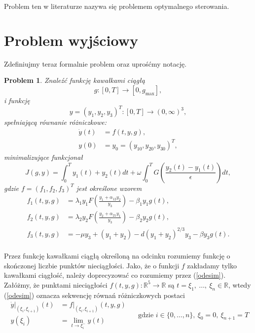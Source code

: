 \documentclass[licencjacka]{pracamgr}
\def\R{\mathbb{R}}
\newtheorem{problem}{Problem}
\begin{document}
Problem ten w literaturze nazywa się problemem optymalnego sterowania.

\section{Problem wyjściowy}
Zdefiniujmy teraz formalnie problem oraz uprośćmy notację.

\begin{problem}\label{problem}
  Znaleźć funkcję kawałkami ciągłą
  \[g: [0, T] \to [0, g_{\max}],\]
  i funkcję
  \[y = {(y_1, y_2, y_3)}^T: [0,T] \to {(0, \infty)}^3,\]
  spełniającą równanie różniczkowe:
  \begin{equation}\label{odesim}
    \begin{aligned}
      \dot{y}(t) &= f(t, y, g), \\
      y(0) &= y_0 = {(y_{10}, y_{20}, y_{30})}^T,
    \end{aligned}
  \end{equation}
  minimalizujące funkcjonał
  \begin{equation}\label{objfsim}
    J(g, y) = \int_0^T y_1(t) + y_2(t)dt + \omega\int_0^T G\left(\frac{y_2(t) - y_1(t)}{\epsilon}\right) dt,
  \end{equation}
  gdzie $f = {(f_1, f_2, f_3)}^T$ jest określone wzorem
  \begin{equation}\label{dynamicsim}
    \begin{aligned}
      f_1(t, y, g) &= \lambda_1y_1F\left(\frac{y_1 + \alpha_{12}y_2}{y_3}\right) - \beta_1y_1g(t), \\
      f_2(t, y, g) &= \lambda_2y_2F\left(\frac{y_2 + \alpha_{21}y_1}{y_3}\right) - \beta_2y_2g(t), \\
      f_3(t, y, g) &= -\mu y_3 + (y_1+y_2) - d{(y_1 + y_2)}^{2/3}y_3 - \beta y_3 g(t). \\
    \end{aligned}
  \end{equation}
\end{problem}

Przez funkcję kawałkami ciągłą określoną na odcinku rozumiemy funkcję o skończonej liczbie punktów nieciągłości. Jako, że o funkcji $f$ zakładamy tylko kawałkami ciągłość, należy doprecyzować co rozumiemy przez (\ref{odesim}). Załóżmy, że punktami nieciągłości $f(t,y,g): \R^5 \to \R$ są $t = \xi_1,\ \ldots,\ \xi_n \in \R$, wtedy (\ref{odesim}) oznacza sekwencję równań różniczkowych postaci
\begin{equation}\label{nonconode}
  \begin{aligned}
    \dot{y}|_{(\xi_i, \xi_{i+1})}(t) &= f|_{(\xi_i, \xi_{i+1})}(t, y, g)\\
    y(\xi_i) &= \lim_{t\to \xi_i^-}y(t)
  \end{aligned}
  \quad \text{ gdzie } i \in \{0,\ldots, n\},\ \xi_0 = 0,\ \xi_{n+1}=T
\end{equation}
\end{document}
